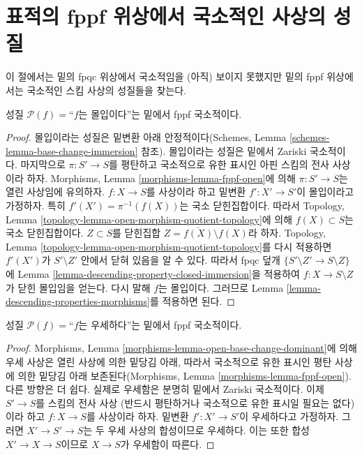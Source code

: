 \section{표적의 fppf 위상에서 국소적인 사상의 성질}
\label{section-descending-properties-morphisms-fppf}

\noindent
이 절에서는 밑의 fpqc 위상에서 국소적임을 (아직) 보이지 못했지만 밑의
fppf 위상에서는 국소적인 스킴 사상의 성질들을 찾는다.

\begin{lemma}
\label{lemma-descending-fppf-property-immersion}
성질 $\mathcal{P}(f) =$“$f$는 몰입이다”는 밑에서 fppf 국소적이다.
\end{lemma}

\begin{proof}
몰입이라는 성질은 밑변환 아래 안정적이다(Schemes, Lemma
\ref{schemes-lemma-base-change-immersion} 참조). 몰입이라는 성질은
밑에서 Zariski 국소적이다. 마지막으로 $\pi : S' \to S$를 평탄하고
국소적으로 유한 표시인 아핀 스킴의 전사 사상이라 하자. Morphisms, Lemma
\ref{morphisms-lemma-fppf-open}에 의해 $\pi : S' \to S$는 열린
사상임에 유의하자. $f : X \to S$를 사상이라 하고 밑변환
$f' : X' \to S'$이 몰입이라고 가정하자. 특히
$f'(X') = \pi^{-1}(f(X))$는 국소 닫힌집합이다. 따라서 Topology, Lemma
\ref{topology-lemma-open-morphism-quotient-topology}에 의해
$f(X) \subset S$는 국소 닫힌집합이다. $Z \subset S$를 닫힌집합
$Z = \overline{f(X)} \setminus f(X)$라 하자. Topology, Lemma
\ref{topology-lemma-open-morphism-quotient-topology}를 다시 적용하면
$f'(X')$가 $S' \setminus Z'$ 안에서 닫혀 있음을 알 수 있다. 따라서 fpqc
덮개 $\{S' \setminus Z' \to S \setminus Z\}$에 Lemma
\ref{lemma-descending-property-closed-immersion}을 적용하여
$f : X \to S \setminus Z$가 닫힌 몰입임을 얻는다. 다시 말해 $f$는
몰입이다. 그러므로 Lemma \ref{lemma-descending-properties-morphisms}를
적용하면 된다.
\end{proof}

\begin{lemma}
\label{lemma-descending-fppf-property-dominant}
성질 $\mathcal{P}(f) =$“$f$는 우세하다”는 밑에서 fppf 국소적이다.
\end{lemma}

\begin{proof}
Morphisms, Lemma \ref{morphisms-lemma-open-base-change-dominant}에 의해
우세 사상은 열린 사상에 의한 밑당김 아래, 따라서 국소적으로 유한 표시인
평탄 사상에 의한 밑당김 아래 보존된다(Morphisms, Lemma
\ref{morphisms-lemma-fppf-open}). 다른 방향은 더 쉽다. 실제로 우세함은
분명히 밑에서 Zariski 국소적이다. 이제 $S' \to S$를 스킴의 전사 사상
(반드시 평탄하거나 국소적으로 유한 표시일 필요는 없다)이라 하고
$f : X \to S$를 사상이라 하자. 밑변환 $f' : X' \to S'$이 우세하다고
가정하자. 그러면 $X' \to S'\to S$는 두 우세 사상의 합성이므로 우세하다.
이는 또한 합성 $X' \to X \to S$이므로 $X\to S$가 우세함이 따른다.
\end{proof}






